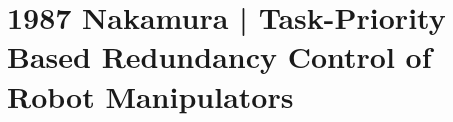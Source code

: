 \section{1987 Nakamura | Task-Priority Based Redundancy Control of Robot Manipulators}

\cite{nakamura1987} 
